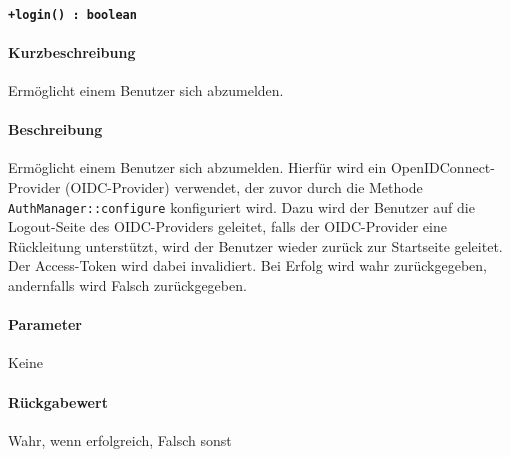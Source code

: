 \paragraph{\texttt{+login() : boolean}}%
\paragraph*{Kurzbeschreibung}
Ermöglicht einem Benutzer sich abzumelden.
\paragraph*{Beschreibung}
Ermöglicht einem Benutzer sich abzumelden.
Hierfür wird ein OpenIDConnect-Provider (OIDC-Provider) verwendet, der zuvor durch die Methode \verb#AuthManager::configure# konfiguriert wird.
Dazu wird der Benutzer auf die Logout-Seite des OIDC-Providers geleitet, falls der OIDC-Provider eine Rückleitung unterstützt, wird der Benutzer wieder zurück zur Startseite geleitet.
Der Access-Token wird dabei invalidiert.
Bei Erfolg wird wahr zurückgegeben, andernfalls wird Falsch zurückgegeben.
\paragraph*{Parameter}
Keine
\paragraph*{Rückgabewert}
Wahr, wenn erfolgreich, Falsch sonst
